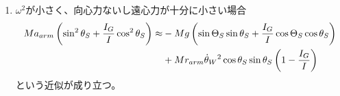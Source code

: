 \documentclass[a4paper,11pt]{jsarticle}
\begin{document}
\begin{enumerate}
  \item $\omega^2$が小さく、向心力ないし遠心力が十分に小さい場合
  \begin{align}
    Ma_{arm}\left( \sin^2\theta_S + \frac{I_G}{I}\cos^2\theta_S \right)
    \approx 
    &- Mg\left( \sin\Theta_S \sin\theta_S + \frac{I_G}{I}\cos\Theta_S \cos\theta_S \right)  
    \notag
    \\
    &+ Mr_{arm}\dot{\theta}_W{}^2\cos\theta_S \sin\theta_S\left( 1 - \frac{I_G}{I} \right)
  \end{align}
  という近似が成り立つ。
\end{enumerate}
\end{document}
